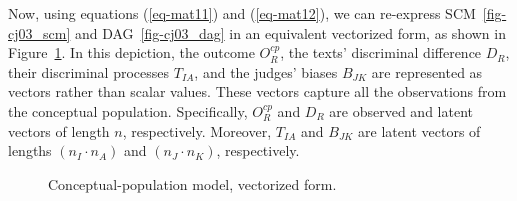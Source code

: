 \documentclass[
  authoryear,
  review,
  1p]{elsarticle}
\begin{document}
Now, using equations (\ref{eq-mat11}) and (\ref{eq-mat12}), we can
re-express SCM~\ref{fig-cj03_scm} and DAG~\ref{fig-cj03_dag} in an
equivalent vectorized form, as shown in Figure~\ref{fig-cj04}. In this
depiction, the outcome \(O^{cp}_{R}\), the texts' discriminal difference
\(D_{R}\), their discriminal processes \(T_{IA}\), and the judges'
biases \(B_{JK}\) are represented as vectors rather than scalar values.
These vectors capture all the observations from the conceptual
population. Specifically, \(O^{cp}_{R}\) and \(D_{R}\) are observed and
latent vectors of length \(n\), respectively. Moreover, \(T_{IA}\) and
\(B_{JK}\) are latent vectors of lengths \((n_{I} \cdot n_{A})\) and
\((n_{J} \cdot n_{K})\), respectively.

\begin{figure}[H]

\begin{minipage}{\linewidth}

\centering{

\[
\begin{aligned}
  O^{cp}_{R} & := f_{O}(D_{R}) \\
  D_{R} & := f_{D}(T_{IA}, B_{JK})
\end{aligned}
\]

}


\end{minipage}%
\newline
\begin{minipage}{\linewidth}



\end{minipage}%

\caption{\label{fig-cj04}Conceptual-population model, vectorized form.}

\end{figure}%
\end{document}
